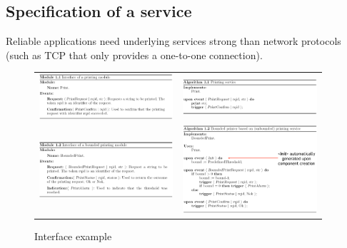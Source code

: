 \subsection{Specification of a service}

Reliable applications need underlying services strong than network protocols
(such as TCP that only provides a one-to-one connection).

\begin{figure}[!ht]
    \begin{tabular}{m{0.475\linewidth}m{0.475\linewidth}}
        \includegraphics[width=\linewidth]{img/ex_inter1.png} &
        \includegraphics[width=\linewidth]{img/ex_inter2.png} \\
        \includegraphics[width=\linewidth]{img/ex_inter3.png} &
        \includegraphics[width=\linewidth]{img/ex_inter4.png}
    \end{tabular}
    \caption{Interface example}
\end{figure}
\FloatBarrier{}


